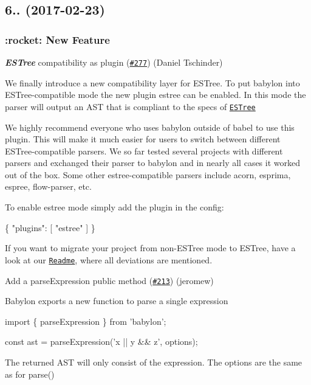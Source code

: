 \subsection*{6.. (2017-\/02-\/23)}

\subsubsection*{\+:rocket\+: New Feature}

{\itshape {\bfseries E\+S\+Tree}} compatibility as plugin (\href{https://github.com/babel/babylon/pull/277}{\tt \#277}) (Daniel Tschinder)

We finally introduce a new compatibility layer for E\+S\+Tree. To put babylon into E\+S\+Tree-\/compatible mode the new plugin {\ttfamily estree} can be enabled. In this mode the parser will output an A\+ST that is compliant to the specs of \href{https://github.com/estree/estree/}{\tt E\+S\+Tree}

We highly recommend everyone who uses babylon outside of babel to use this plugin. This will make it much easier for users to switch between different E\+S\+Tree-\/compatible parsers. We so far tested several projects with different parsers and exchanged their parser to babylon and in nearly all cases it worked out of the box. Some other estree-\/compatible parsers include {\ttfamily acorn}, {\ttfamily esprima}, {\ttfamily espree}, {\ttfamily flow-\/parser}, etc.

To enable {\ttfamily estree} mode simply add the plugin in the config\+: 
\begin{DoxyCode}
\{
  "plugins": [ "estree" ]
\}
\end{DoxyCode}


If you want to migrate your project from non-\/\+E\+S\+Tree mode to E\+S\+Tree, have a look at our \href{https://github.com/babel/babylon/#output}{\tt Readme}, where all deviations are mentioned.

Add a parse\+Expression public method (\href{https://github.com/babel/babylon/pull/213}{\tt \#213}) (jeromew)

Babylon exports a new function to parse a single expression


\begin{DoxyCode}
import \{ parseExpression \} from 'babylon';

const ast = parseExpression('x || y && z', options);
\end{DoxyCode}


The returned A\+ST will only consist of the expression. The options are the same as for {\ttfamily parse()}

